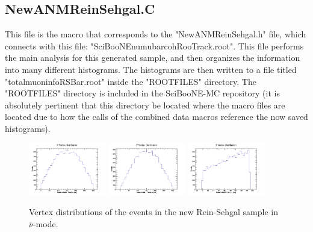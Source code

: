 \documentclass[11pt]{article}
\begin{document}
\subsection{NewANMReinSehgal.C}
This file is the macro that corresponds to the "NewANMReinSehgal.h" file, which connects with this file: "SciBooNE\textunderscore numubar\textunderscore coh\textunderscore RooTrack.root". This file performs the main analysis for this generated sample, and then organizes the information into many different histograms. The histograms are then written to a file titled "totalmuoninfoRSBar.root" inside the "ROOTFILES" directory. The "ROOTFILES" directory is included in the SciBooNE-MC repository (it is absolutely pertinent that this directory be located where the macro files are located due to how the calls of the combined data macros reference the now saved histograms).

\begin{figure}[H]
\centering
\includegraphics[width=0.3\textwidth]{NewANMReinSehgalImages/4-XVertexDistributionANMRS.png}
\includegraphics[width=0.3\textwidth]{NewANMReinSehgalImages/3-YVertexDistributionANMRS.png}
\includegraphics[width=0.3\textwidth]{NewANMReinSehgalImages/2-ZVertexDistributionANMRS.png}
\caption{Vertex distributions of the events in the new Rein-Sehgal sample in $\bar{\nu}$-mode.}
\end{figure}
\end{document}
